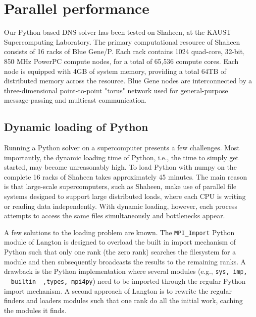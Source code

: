 \documentclass[11pt, oneside]{article}
\newcommand{\inpyth}{\lstinline[style=pythonstyle, basicstyle=\ttfamily]} %[]%
\begin{document}
\section{Parallel performance}
Our Python based DNS solver has been tested on Shaheen, at the KAUST Supercomputing Laboratory. The primary computational resource of Shaheen consists of 16 racks of Blue Gene/P. Each rack contains 1024 quad-core, 32-bit, 850 MHz PowerPC compute nodes, for a total of 65,536 compute cores. Each node is equipped with 4GB of system memory, providing a total 64TB of distributed memory across the resource. Blue Gene nodes are interconnected by a three-dimensional point-to-point "torus" network used for general-purpose message-passing and multicast communication. 

\subsection{Dynamic loading of Python}
Running a Python solver on a supercomputer presents a few challenges. Most importantly, the dynamic loading time of Python, i.e., the time to simply get started, may become unreasonably high. To load Python with numpy on the complete 16 racks of Shaheen takes approximately 45 minutes. The main reason is that large-scale supercomputers, such as Shaheen, make use of parallel file systems designed to support large distributed loads, where each CPU is writing or reading data independently. With dynamic loading, however, each process attempts to access the same files simultaneously and bottlenecks appear. 

A few solutions to the loading problem are known. The \inpyth{MPI_Import} Python module of Langton \cite{mpi_import} is designed to overload the built in import mechanism of Python such that only one rank (the zero rank) searches the filesystem for a module and then subsequently broadcasts the results to the remaining ranks. A drawback is the Python implementation where several modules (e.g., \inpyth{sys, imp, __builtin__,types, mpi4py}) need to be imported through the regular Python import mechanism. A second approach of Langton is to rewrite the regular finders and loaders modules such that one rank do all the initial work, caching the modules it finds. 
\end{document}
